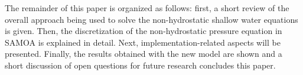 The remainder of this paper is organized as follows: first, a short review of the overall approach being used to solve the non-hydrostatic shallow water equations is given. Then, the discretization of the non-hydrostatic pressure equation in SAMOA is explained in detail. Next, implementation-related aspects will be presented. Finally, the results obtained with the new model are shown and a short discussion of open questions for future research concludes this paper.


